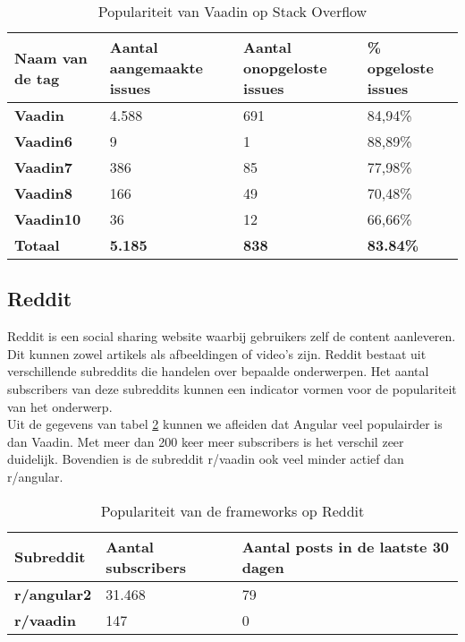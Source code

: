 \begin{table}[H]
	\begin{tabular}{|l|l|l|l|}
		\hline
		Naam van de tag   & \textbf{Aantal aangemaakte issues} & \textbf{Aantal onopgeloste issues} & \textbf{\% opgeloste issues} \\ \hline
		\textbf{Vaadin}  & 4.588                            & 691                             & 84,94\%                              \\ \hline
		\textbf{Vaadin6} & 9                              & 1                              & 88,89\%                              \\ \hline
		\textbf{Vaadin7} & 386                              & 85                              & 77,98\%                              \\ \hline
		\textbf{Vaadin8} & 166                                & 49                                & 70,48\%                              \\ \hline
		\textbf{Vaadin10} & 36                                & 12                                & 66,66\%                              \\ \hline
		\textbf{Totaal}   & \textbf{5.185}                   & \textbf{838}                    & \textbf{83.84\%}                     \\ \hline
	\end{tabular}
	\caption{Populariteit van Vaadin op Stack Overflow}
	\label{table:vaadinstackoverflow}
\end{table}

\subsection{Reddit}
Reddit is een social sharing website waarbij gebruikers zelf de content aanleveren. Dit kunnen zowel artikels als afbeeldingen of video's zijn. Reddit bestaat uit verschillende subreddits die handelen over bepaalde onderwerpen. Het aantal subscribers van deze subreddits kunnen een indicator vormen voor de populariteit van het onderwerp.\\

Uit de gegevens van tabel \ref{table:reddit} kunnen we afleiden dat Angular veel populairder is dan Vaadin. Met meer dan 200 keer meer subscribers is het verschil zeer duidelijk. Bovendien is de subreddit r/vaadin ook veel minder actief dan r/angular.
\begin{table}[H]
	\begin{tabular}{|l|l|l|}
		\hline
		\textbf{Subreddit}  & \textbf{Aantal subscribers} & \textbf{Aantal posts in de laatste 30 dagen} \\ \hline
		\textbf{r/angular2} & 31.468                      & 79                                           \\ \hline
		\textbf{r/vaadin}   & 147                         & 0                                            \\ \hline
	\end{tabular}
	\caption{Populariteit van de frameworks op Reddit}
\label{table:reddit}
\end{table}

